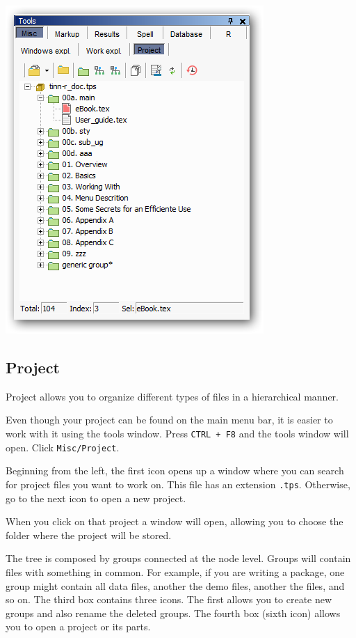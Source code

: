 \includegraphics[scale=0.50]{./res/tools_misc_project.png}

\subsection{Project}

Project allows you to organize different types of files in a hierarchical manner.

Even though your project can be found on the main menu bar, it is easier to work with it using the tools window.
Press \texttt{CTRL + F8} and the tools window will open. Click \texttt{Misc/Project}.

Beginning from the left, the first icon opens up a window where you can search for project files you want to work on.
This file has an extension \texttt{.tps}. Otherwise, go to the next icon to open a new project.

When you click on that project a window will open, allowing you to choose the folder where the project will be stored.

The tree is composed by groups connected at the node level. Groups will contain files with something in common.
For example, if you are writing a package, one group might contain all data files,
another the demo files, another the \RR{} files, and so on. The third box contains three icons.
The first allows you to create new groups and also rename the  deleted groups.
The fourth box (sixth icon) allows you to  open a project or its parts.

